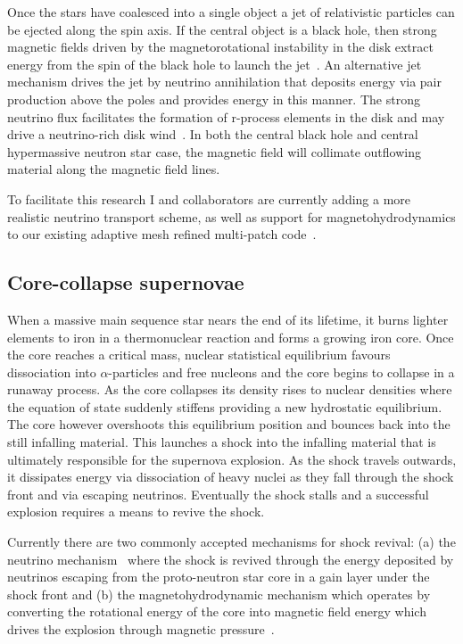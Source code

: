\documentclass[12pt]{article}
\begin{document}
Once the stars have coalesced into a single object a jet of
relativistic particles can be ejected along the spin axis.
If the central object is a black hole, then strong magnetic fields
driven by the magnetorotational instability in
the disk extract energy from the spin of the black hole to launch the
jet~\cite{Blandford1977}.
An alternative jet mechanism drives the jet by neutrino annihilation that
deposits energy via pair production above the poles and
provides energy in this manner. The strong neutrino flux
facilitates the formation of r-process elements in the disk and may
drive a neutrino-rich disk wind~\cite{1999ApJ...525L.121F,Roberts:2010wh}.
In both the central black hole and central hypermassive
neutron star case, the magnetic field will collimate outflowing
material along the magnetic field lines.

To facilitate this research I and collaborators are currently adding a more
realistic neutrino
transport scheme, as well as support for magnetohydrodynamics to our existing
adaptive mesh refined multi-patch code~\cite{all:mpmhdnu}.  

\subsection{Core-collapse supernovae}
When a massive main sequence star nears the end of its lifetime, it burns
lighter elements to iron in a thermonuclear reaction and forms a growing 
iron core. Once the core reaches
a critical mass, nuclear statistical equilibrium favours dissociation into
$\alpha$-particles and free nucleons and the core begins to collapse in a
runaway process.
As the core collapses its density rises to nuclear densities where the
equation of state suddenly stiffens providing a new hydrostatic equilibrium.
The core however overshoots this equilibrium position and bounces back into
the still infalling material. This launches a shock into the infalling
material that is ultimately responsible for the supernova
explosion. As the shock travels outwards, it dissipates energy via
dissociation of heavy nuclei as they fall through the shock front and
via escaping neutrinos. Eventually
the shock stalls and a successful explosion requires a means to revive the
shock. 

Currently there are two commonly accepted mechanisms for shock revival:
(a) the neutrino mechanism~\cite{1985nuas.conf..422W} %
where the shock is revived through the energy deposited by
neutrinos escaping from the proto-neutron star core in a gain layer under the
shock front and (b) the magnetohydrodynamic mechanism which operates by
converting the rotational energy of the core into magnetic field energy which
drives the explosion through magnetic
pressure~\cite{Janka:2012wk,Burrows:07b}.
\end{document}
